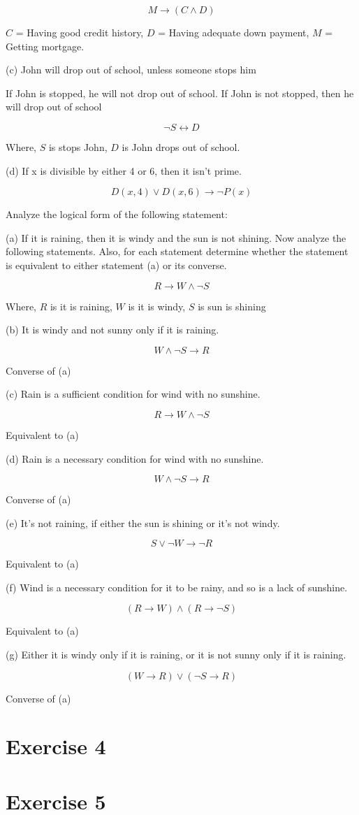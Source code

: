 \documentclass[11pt]{article}
\newcommand{\then}{\rightarrow}
\newcommand{\ifonly}{\leftrightarrow}
\begin{document}
$$M \then (C \wedge D)$$

$C$ = Having good credit history,
$D$ = Having adequate down payment,
$M$ = Getting mortgage.

\noindent (c) John will drop out of school, unless someone stops him

If John is stopped, he will not drop out of school. If John is not stopped, then 
he will drop out of school

$$\neg S \ifonly D$$

Where,
$S$ is stops John,
$D$ is John drops out of school.

\noindent (d) If x is divisible by either 4 or 6, then it isn't prime.

$$D(x, 4) \vee D(x, 6) \then \neg P(x)$$

\noindent Analyze the logical form of the following statement:


\noindent (a) If it is raining, then it is windy and the sun is not shining.
Now analyze the following statements. Also, for each statement determine
whether the statement is equivalent to either statement (a) or its converse.

$$R \then W \wedge \neg S$$

Where,
$R$ is it is raining,
$W$ is it is windy,
$S$ is sun is shining

\noindent (b) It is windy and not sunny only if it is raining.

$$W \wedge \neg S \then R$$

Converse of (a)

\noindent (c) Rain is a sufficient condition for wind with no sunshine.

$$R \then W \wedge \neg S$$

Equivalent to (a)

\noindent (d) Rain is a necessary condition for wind with no sunshine.

$$W \wedge \neg S \then R$$

Converse of (a)

\noindent (e) It's not raining, if either the sun is shining or it's not windy.

$$S \vee \neg W \then \neg R$$

Equivalent to (a)

\noindent (f) Wind is a necessary condition for it to be rainy, and so is a lack of
sunshine.

$$(R \then W) \wedge (R \then \neg S)$$ %

Equivalent to (a)

\noindent (g) Either it is windy only if it is raining, or it is not sunny only if it is
raining.

$$(W \then R) \vee (\neg S \then R)$$ %

Converse of (a)

\section*{Exercise 4}


\section*{Exercise 5}

\end{document}
